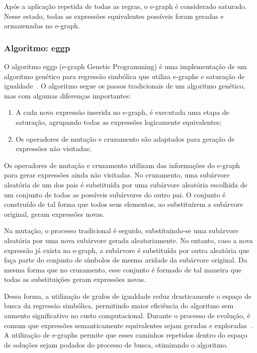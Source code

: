 Após a aplicação repetida de todas as regras, o e-graph é considerado saturado. Nesse estado, todas as expressões equivalentes possíveis foram geradas e armazenadas no e-graph.

\subsubsection{Algoritmo: eggp}

O algoritmo eggp (e-graph Genetic Programming) é uma implementação de um algoritmo genético para regressão simbólica que utiliza e-graphs e saturação de igualdade~\cite{eggp}. O algoritmo segue os passos tradicionais de um algoritmo genético, mas com algumas diferenças importantes:
\begin{enumerate}
  \item A cada nova expressão inserida no e-graph, é executada uma etapa de saturação, agrupando todas as expressões logicamente equivalentes;
  \item Os operadores de mutação e cruzamento são adaptados para geração de expressões não visitadas;
\end{enumerate}

Os operadores de mutação e cruzamento utilizam das informações do e-graph para gerar expressões ainda não visitadas. No cruzamento, uma subárvore aleatória de um dos pais é substituída por uma subárvore aleatória escolhida de um conjunto de todas as possíveis subárvores do outro pai. O conjunto é construído de tal forma que todos seus elementos, ao substituírem a subárvore original, geram expressões novas.

Na mutação, o processo tradicional é seguido, substituindo-se uma subárvore aleatória por uma nova subárvore gerada aleatoriamente. No entanto, caso a nova expressão já exista no e-graph, a subárvore é substituída por outra aleatória que faça parte do conjunto de símbolos de mesma aridade da subárvore original. Da mesma forma que no cruzamento, esse conjunto é formado de tal maneira que todas as substituições geram expressões novas.

Dessa forma, a utilização de grafos de igualdade reduz drasticamente o espaço de busca da regressão simbólica, permitindo maior eficiência do algoritmo sem aumento significativo no custo computacional. Durante o processo de evolução, é comum que expressões semanticamente equivalentes sejam geradas e exploradas~\cite{eggp,inefficiency_gp}. A utilização de e-graphs permite que esses caminhos repetidos dentro do espaço de soluções sejam podados do processo de busca, otimizando o algoritmo.

